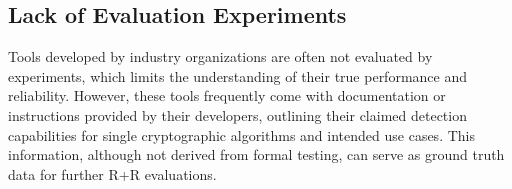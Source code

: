
\subsection{Lack of Evaluation Experiments}

Tools developed by industry organizations are often not evaluated by experiments, which limits the understanding of their true performance and reliability. However, these tools frequently come with documentation or instructions provided by their developers, outlining their claimed detection capabilities for single cryptographic algorithms and intended use cases. This information, although not derived from formal testing, can serve as ground truth data for further R+R evaluations.

